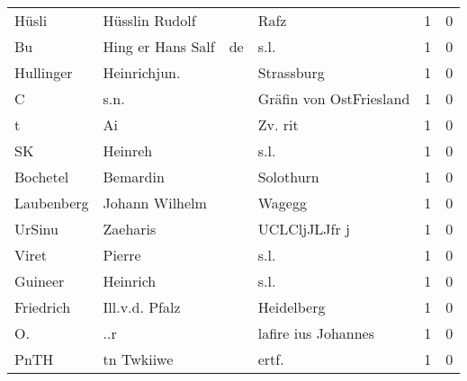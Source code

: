 \begin{tabular}{llllrr}
                    Hüsli &                     Hüsslin Rudolf &             &                                        Rafz &          1 &         0 \\
                       Bu &                  Hing er Hans Salf &          de &                                        s.l. &          1 &         0 \\
                Hullinger &                       Heinrichjun. &             &                                  Strassburg &          1 &         0 \\
                        C &                               s.n. &             &                     Gräfin von OstFriesland &          1 &         0 \\
                        t &                                 Ai &             &                                     Zv. rit &          1 &         0 \\
                       SK &                            Heinreh &             &                                        s.l. &          1 &         0 \\
                 Bochetel &                           Bemardin &             &                                   Solothurn &          1 &         0 \\
               Laubenberg &                     Johann Wilhelm &             &                                      Wagegg &          1 &         0 \\
                   UrSinu &                           Zaeharis &             &                               UCLCljJLJfr j &          1 &         0 \\
                    Viret &                             Pierre &             &                                        s.l. &          1 &         0 \\
                  Guineer &                           Heinrich &             &                                        s.l. &          1 &         0 \\
                Friedrich &                     Ill.v.d. Pfalz &             &                                  Heidelberg &          1 &         0 \\
                       O. &                                ..r &             &                         lafire ius Johannes &          1 &         0 \\
                     PnTH &                         tn Twkiiwe &             &                                      ertf.  &          1 &         0 \\

\end{tabular}
